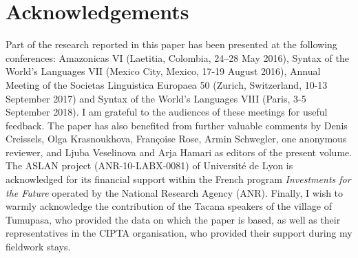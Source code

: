 \documentclass[output=paper,draft,draftmode,colorlinks,citecolor=brown]{langscibook}
\begin{document}
\section*{Acknowledgements}
Part of the research reported in this paper has been presented at the following conferences: Amazonicas VI (Laetitia, Colombia, 24--28 May 2016), Syntax of the World’s Languages VII (Mexico City, Mexico, 17-19 August 2016), Annual Meeting of the Societas Linguistica Europaea 50 (Zurich, Switzerland, 10-13 September 2017) and Syntax of the World's Languages VIII (Paris, 3-5 September 2018). I am grateful to the audiences of these meetings for useful feedback. The paper has also benefited from further valuable comments by Denis Creissels, Olga Krasnoukhova, Françoise Rose, Armin Schwegler, one anonymous reviewer, and Ljuba Veselinova and Arja Hamari as editors of the present volume. The ASLAN project (ANR-10-LABX-0081) of Université de Lyon is acknowledged for its financial support within the French program \textit{Investments for the Future} operated by the National Research Agency (ANR). Finally, I wish to warmly acknowledge the contribution of the Tacana speakers of the village of Tumupasa, who provided the data on which the paper is based, as well as their representatives in the CIPTA organisation, who provided their support during my fieldwork stays.

{\sloppy\printbibliography[heading=subbibliography,notkeyword=this]}
\end{document}
